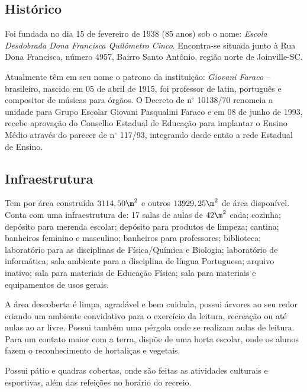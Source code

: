 
\subsection{Histórico} %
\label{sec:Histórico}
Foi fundada no dia 15 de fevereiro de 1938 (85 anos) sob o nome: \textit{Escola Desdobrada Dona Francisca Quilômetro Cinco}. Encontra-se situada junto à Rua Dona Francisca, número 4957, Bairro Santo Antônio, região norte de Joinville-SC. 

Atualmente têm em seu nome o patrono da instituição: \emph{Giovani Faraco} -- brasileiro, nascido em 05 de abril de 1915, foi professor de latin, português e compositor de músicas para órgãos. O Decreto de n$^\circ$ 10138/70 renomeia a unidade para Grupo Escolar Giovani Pasqualini Faraco e em 08 de junho de 1993, recebe aprovação do Conselho Estadual de Educação para implantar o Ensino Médio através do parecer de n$^\circ$ 117/93, integrando desde então a rede Estadual de Ensino.

\subsection{Infraestrutura} %
\label{sec:Infraestrutura}

Tem por área construída  $3114,50\m^2$ e outros $13929,25\m^2$ de área disponível. Conta com uma infraestrutura de: 17 salas de aulas de $42\m^2$ cada; cozinha; depósito para merenda escolar; depósito para produtos de limpeza; cantina; banheiros feminino e masculino; banheiros para professores; biblioteca; laboratório para as disciplinas de Física/Química e Biologia; laboratório de informática; sala ambiente para a disciplina de língua Portuguesa; arquivo inativo; sala para materiais de Educação Física; sala para materiais e equipamentos de usos gerais. 

A área descoberta é limpa, agradável e bem cuidada, possui árvores ao seu redor criando um ambiente convidativo para o exercício da leitura, recreação ou até aulas ao ar livre. Possui também uma pérgola onde se realizam aulas de leitura. Para um contato maior com a terra, dispõe de uma horta escolar, onde os alunos fazem o reconhecimento de hortaliças e vegetais.

Possui pátio e quadras cobertas, onde são feitas as atividades culturais e esportivas, além das refeições no horário do recreio.

